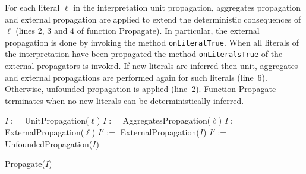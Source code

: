 \documentclass[a4paper,12pt]{article}
\begin{document}
	For each literal $\ell$ in the interpretation unit propagation, aggregates propagation and external propagation are applied to extend the deterministic consequences of $\ell$ (lines 2, 3 and 4 of function Propagate).
	In particular, the external propagation is done by invoking the method  \verb|onLiteralTrue|.
	When all literals of the interpretation have been propagated the method \verb|onLiteralsTrue| of the external propagators is invoked.
	If new literals are inferred then unit, aggregates and external propagations are performed again for such literals (line~6).
	Otherwise, unfounded propagation is applied (line~2).
	Function Propagate terminates when no new literals can be deterministically inferred.
	 
	\begin{function}[t]
		{
			$I :=$ UnitPropagation($\ell$)\;
			$I :=$ AggregatesPropagation($\ell$)\;
			$I :=$ ExternalPropagation($\ell$)
		}
		$I' :=$ ExternalPropagation($I$)
		$I' :=$ UnfoundedPropagation($I$)\;
		\caption{Propagate($I$)}\label{fn:propagate}
	\end{function}
	
\end{document}
